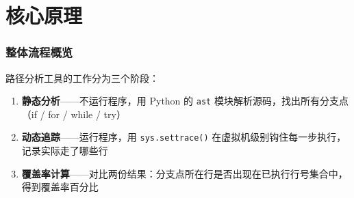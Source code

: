 \documentclass[presentation,aspectratio=169]{ctexbeamer}
\begin{document}

\section{核心原理}

\begin{frame}
\frametitle{整体流程概览}
路径分析工具的工作分为三个阶段：

\vspace{0.5cm}
\begin{enumerate}
    \item \textbf{静态分析}——不运行程序，用 Python 的 \texttt{ast} 模块解析源码，找出所有分支点（if / for / while / try）
    \vspace{0.3cm}
    \item \textbf{动态追踪}——运行程序，用 \texttt{sys.settrace()} 在虚拟机级别钩住每一步执行，记录实际走了哪些行
    \vspace{0.3cm}
    \item \textbf{覆盖率计算}——对比两份结果：分支点所在行是否出现在已执行行号集合中，得到覆盖率百分比
\end{enumerate}
\end{frame}

\end{document}
